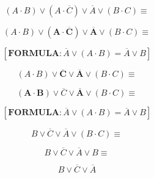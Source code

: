 \documentclass[10pt]{beamer}
\theoremstyle{remark}
\theoremstyle{definition}
\begin{document}
\begin{frame}[allowframebreaks]
$$(A \cdot B) \vee (A \cdot \overline{C}) \vee \overline{A} \vee (B \cdot C) \equiv $$

\framebreak

$$(A \cdot B) \vee \boldsymbol{(A \cdot \overline{C}) \vee \overline{A}} \vee (B \cdot C) \equiv $$

$$[ \boldsymbol{FORMULA:}  \overline{A} \vee (A \cdot B) = \overline{A} \vee B ]$$

$$(A \cdot B) \vee \boldsymbol{\overline{C} \vee \overline{A}} \vee (B \cdot C) \equiv $$

\framebreak 

$$\boldsymbol{(A \cdot B)} \vee \overline{C} \vee \boldsymbol{\overline{A}} \vee (B \cdot C) \equiv $$

$$[ \boldsymbol{FORMULA:} \overline{A} \vee (A \cdot B) = \overline{A} \vee B ]$$

$$B \vee \overline{C} \vee \overline{A} \vee (B \cdot C) \equiv $$


$$B \vee \overline{C} \vee \overline{A} \vee B \equiv $$

$$B \vee \overline{C} \vee \overline{A} $$

\end{frame}
\end{document}
